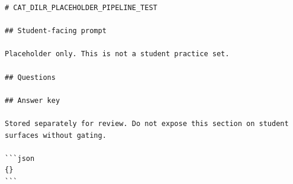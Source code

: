 \documentclass[11pt]{article}
\begin{document}
\begin{verbatim}
# CAT_DILR_PLACEHOLDER_PIPELINE_TEST

## Student-facing prompt

Placeholder only. This is not a student practice set.

## Questions

## Answer key

Stored separately for review. Do not expose this section on student surfaces without gating.

```json
{}
```

\end{verbatim}
\end{document}
